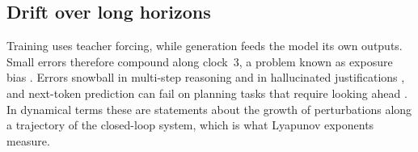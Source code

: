 \subsection{Drift over long horizons}

Training uses teacher forcing, while generation feeds the model its own outputs. Small errors therefore compound along clock~3, a problem known as exposure bias \citep{bengio2015scheduled,wang2020exposure}. Errors snowball in multi-step reasoning \citep{dziri2023faith} and in hallucinated justifications \citep{zhang2023language}, and next-token prediction can fail on planning tasks that require looking ahead \citep{bachmann2024pitfalls}. In dynamical terms these are statements about the growth of perturbations along a trajectory of the closed-loop system, which is what Lyapunov exponents measure.
